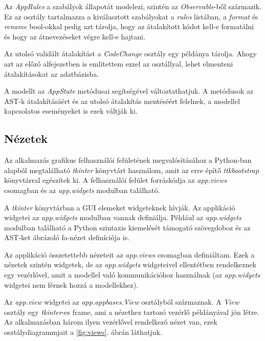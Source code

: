 Az \emph{AppRules} a szabályok állapotát modelezi, szintén az \emph{Observable}-ből
származik.
Ez az osztály tartalmazza a kiválasztott szabályokat a \emph{rules} listában,
a \emph{format} és \emph{rename} bool-okkal pedig azt tárolja, hogy az átalakított
kódot kell-e formatálni és hogy az átnevezéseket végre kell-e hajtani.

\pagebreak

Az utolsó validált átalakítást a \emph{CodeChange} osztály egy példánya tárolja.
Ahogy azt az előző alfejezetben is említettem ezzel az osztállyal,
lehet elmenteni átalakításokat az adatbázisba.

A modellt az \emph{AppState} metódusai segítségével változtathatjuk.
A metódusok az AST-k átalakításáért és az utolsó átalakítás mentéséért felelnek,
a modellel kapcsolatos eseményeket is ezek váltják ki.

\subsection{Nézetek}

Az alkalmazás grafikus felhasználói felületének megvalósításához
a Python-ban alapból megtalálható
\emph{tkinter} könyvtárt használom, amit az erre építő \emph{ttkbootstrap} könyvtárral
egészítek ki.
A felhasználói felület forráskódja az \emph{app.views} csomagban és az \emph{app.widgets}
modulban található.

A \emph{tkinter} könyvtárban a GUI elemeket widgeteknek hívják.
Az applikáció widgetei az \emph{app.widgets} modulban vannak definiálja.
Például az \emph{app.widgets} modulban található
a Python szintaxis kiemelését támogató szövegdoboz
és az AST-ket ábrázoló fa-nézet definíciója is.

Az applikáció összetettebb nézeteit az \emph{app.views} csomagban definiáltam.
Ezek a nézetek szintén widgetek,
de az \emph{app.widgets} widgeteivel ellentétben rendelkeznek egy vezérlővel,
amit a modellel való kommunikációhoz használnak
(az \emph{app.widgets} widgetei nem férnek hozzá a modellekhez).

Az \emph{app.view} widgetei az \emph{app.appbases.View} osztályból származnak.
A \emph{View} osztály egy \emph{tkinter}-es frame, ami a nézethez tartozó 
vezérlő példányával jön létre.
Az alkalmazásban három ilyen vezérlővel rendelkező nézet van,
ezek osztálydiagrammjait a \ref{fig:views}. ábrán láthatjuk.

